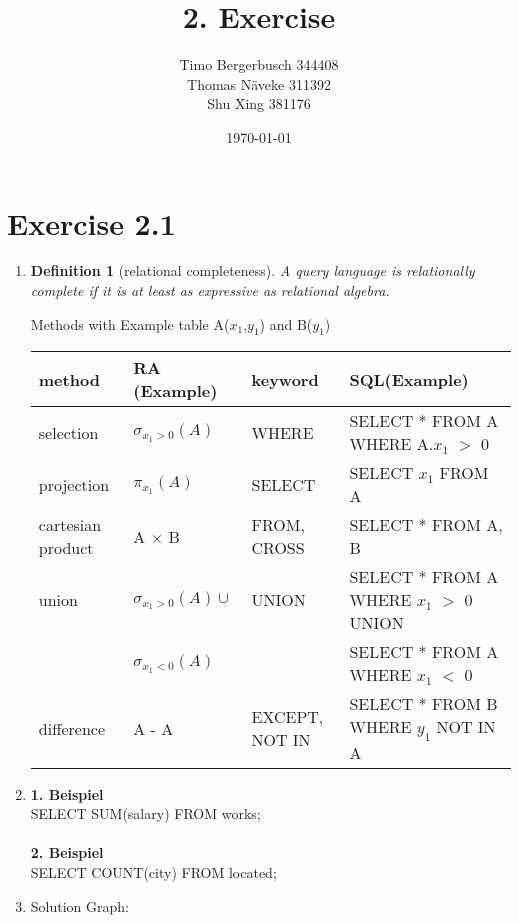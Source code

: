 \documentclass[12pt]{article}
\newtheorem{definition}[theorem]{Definition}
\begin{document}
	
	\title{2. Exercise}
	\author{Timo Bergerbusch 344408 \\ Thomas Näveke 311392 \\ Shu Xing 381176}
	\date{\specialdate\today}
	\maketitle
	
	\section{Exercise 2.1}
	\begin{enumerate}[label=2.1.\arabic*]
		\item \begin{definition}[relational completeness]
			A query language is relationally complete if it is at least as expressive as relational algebra.
		\end{definition}
		Methods with Example table A(\underline{$x_1$},$y_1$) and B(\underline{$y_1$}) \\
		\hspace*{-1cm}\begin{tabular}[c]{l | l | l | l}
			method & RA (Example) & keyword &SQL(Example) \\ \hline \hline
			selection & $\sigma_{x_1 > 0}(A)$ & WHERE &SELECT * FROM A WHERE A.$x_1$ $>$ 0 \\
			projection & $\pi_{x_1}(A)$ & SELECT &SELECT $x_1$ FROM A \\
			cartesian product & A $\times$ B & FROM, CROSS& SELECT * FROM A, B \\
			union & $\sigma_{x_1 > 0}(A) \cup$ & UNION & SELECT * FROM A WHERE $x_1$ $>$ 0 UNION \\
			& $\sigma_{x_1 < 0}(A)$ & & SELECT * FROM A WHERE $x_1$ $<$ 0  \\
			difference & A - A & EXCEPT, NOT IN& SELECT * FROM B WHERE $y_1$ NOT IN A \\
		\end{tabular}
		\item \textbf{1. Beispiel}\\
			  SELECT SUM(salary) FROM works;\\\\
			  \textbf{2. Beispiel}\\
			  SELECT COUNT(city) FROM located; 
		\item Solution Graph:
			\begin{figure}[H]
				\centering
\end{figure}
\end{enumerate}
\end{document}
